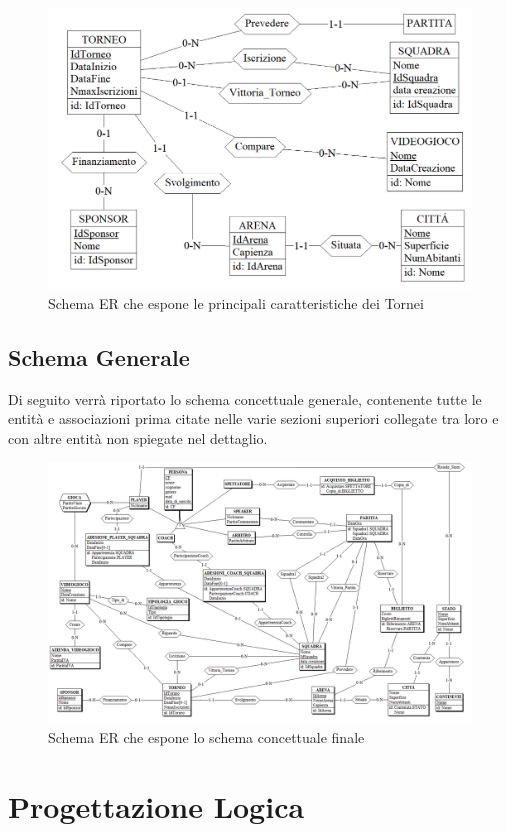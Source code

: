 \documentclass[a4paper,12pt]{report}
\begin{document}
\begin{figure}[!htb]
	\centerline{\includegraphics[scale=0.6]{img/ER_Tornei.png}}
	\caption{Schema ER che espone le principali caratteristiche dei Tornei}
	\label{img:ER_Tornei}
\end{figure}
\section{Schema Generale}
Di seguito verrà riportato lo schema concettuale generale, contenente tutte le entità e associazioni prima citate nelle varie sezioni superiori collegate tra loro e con altre entità non spiegate nel dettaglio.
\begin{figure}[!htb]
	\centerline{\includegraphics[scale=0.55]{img/ER_Generale.png}}
	\caption{Schema ER che espone lo schema concettuale finale}
	\label{img:ER_Generale}
\end{figure}

\chapter{Progettazione Logica}
\end{document}
